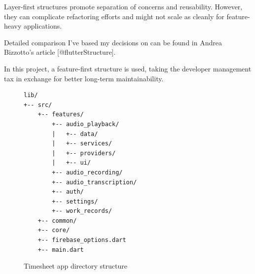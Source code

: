 \documentclass[
  digital,     %
  oneside,     %
  nosansbold,  %
  nocolorbold, %
  lof,         %
  lot,         %
]{fithesis4}
\begin{document}
\begin{markdown}

Layer-first structures promote separation of concerns and reusability.  
However, they can complicate refactoring efforts and might not scale as cleanly for feature-heavy applications.

Detailed comparison I've based my decisions on can be found in Andrea Bizzotto's article [@flutterStructure].

In this project, a feature-first structure is used, taking the developer management tax in exchange for better long-term maintainability.

\end{markdown}
\begin{figure}[ht]
  \begin{center}
    \begin{minipage}{.8\textwidth}
      \begin{verbatim}
lib/
+-- src/
    +-- features/
        +-- audio_playback/
        |   +-- data/
        |   +-- services/
        |   +-- providers/
        |   +-- ui/
        +-- audio_recording/
        +-- audio_transcription/
        +-- auth/
        +-- settings/
        +-- work_records/
    +-- common/
    +-- core/
    +-- firebase_options.dart
    +-- main.dart
      \end{verbatim}
    \end{minipage}
  \end{center}
  \caption{Timesheet app directory structure}
  \label{fig:project_directory_timesheet}
\end{figure}
\end{document}
